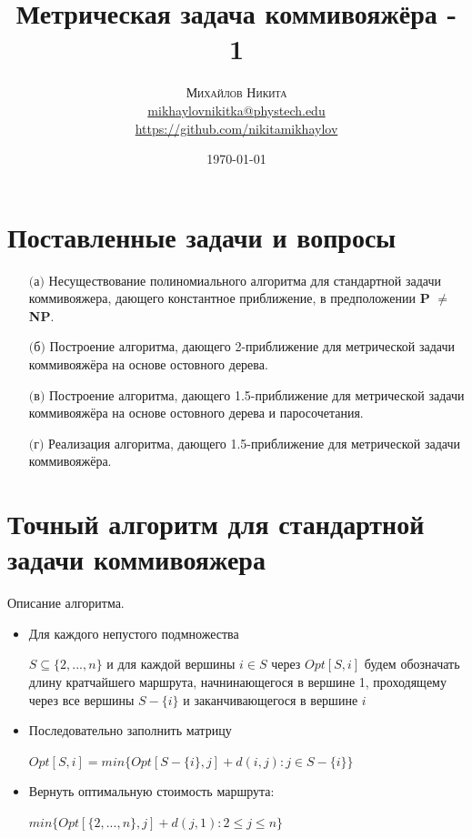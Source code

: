\documentclass[A4, twocolumn]{article}
\title{
\textbf{Метрическая задача коммивояжёра - 1} 
}
\date{\today}
\author{ 
	\textsc{Михайлов Никита} \\
	\normalsize \href{mailto:mikhaylovnikitka@phystech.edu}{mikhaylovnikitka@phystech.edu} \\
	\normalsize \href{https://github.com/nikitamikhaylov}{https://github.com/nikitamikhaylov}
}
\begin{document}
    \maketitle
    
	
	\section{\textbf{Поставленные задачи и вопросы}}
	
		\begin{enumerate}
			\item[$($а$)$] Несуществование полиномиального алгоритма для стандартной задачи коммивояжера, дающего константное приближение, в предположении \textbf{P} $\ne$ \textbf{NP}.
			\item[$($б$)$] Построение алгоритма, дающего 2-приближение для метрической задачи коммивояжёра на основе остовного дерева.
			\item[$($в$)$] Построение алгоритма, дающего 1.5-приближение для метрической задачи коммивояжёра на основе остовного дерева и паросочетания. 
			\item[$($г$)$] Реализация алгоритма, дающего 1.5-приближение для метрической задачи коммивояжёра.
		\end{enumerate}
	
	\section{\textbf{Точный алгоритм для стандартной задачи коммивояжера}}	
	Описание алгоритма.
	\begin{itemize}
		\item Для каждого непустого подмножества 
		
		$S \subseteq \{2, . . . , n\}$ и для каждой вершины $i \in S$ через $Opt[S,i]$ будем обозначать длину кратчайшего маршрута, начнинающегося в вершине 1, проходящему через все вершины $S − \{i\}$ и заканчивающегося в вершине $i$
		\item Последовательно заполнить матрицу 
		
		$Opt [S , i ] = min\{Opt [S − \{i \}, j ] + d (i , j ) : j ∈ S − \{i \}\}$
		\item Вернуть оптимальную стоимость маршрута: 
		
		$min\{Opt[\{2,...,n\},j]+d(j,1):2 \leq j \leq n\}$
	\end{itemize}		
\end{document}
